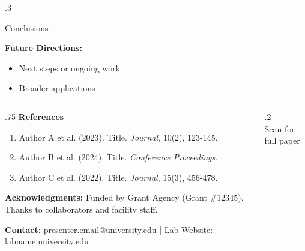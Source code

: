 \documentclass[final,t]{beamer}
\begin{document}
\begin{frame}[t]
\begin{columns}[t,onlytextwidth]
\begin{column}{.3\linewidth}
\begin{block}{Conclusions}
        \vspace{0.5cm}
        
        \textbf{Future Directions:}
        \begin{itemize}
          \item Next steps or ongoing work
          \item Broader applications
        \end{itemize}
      \end{block}
      
    \end{column}
    
  \end{columns}
  
  \vspace{1cm}
  
  
  \begin{block}{}
    \footnotesize
    \begin{columns}[T,onlytextwidth]
      \begin{column}{.75\linewidth}
        \textbf{References}
        \begin{enumerate}
          \item Author A et al. (2023). Title. \textit{Journal}, 10(2), 123-145.
          \item Author B et al. (2024). Title. \textit{Conference Proceedings}.
          \item Author C et al. (2022). Title. \textit{Journal}, 15(3), 456-478.
        \end{enumerate}
        
        \vspace{0.3cm}
        
        \textbf{Acknowledgments:} Funded by Grant Agency (Grant \#12345). Thanks to collaborators and facility staff.
        
        \vspace{0.3cm}
        
        \textbf{Contact:} presenter.email@university.edu | Lab Website: labname.university.edu
      \end{column}
      
      \begin{column}{.2\linewidth}
        \centering
        \\
        \tiny Scan for full paper
      \end{column}
    \end{columns}
  \end{block}
  
\end{frame}
\end{document}

